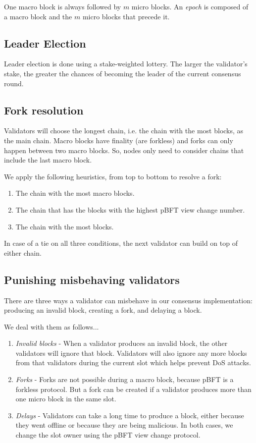 \documentclass[8pt,fleqn,openany]{book}
\begin{document}
One macro block is always followed by $m$ micro blocks. An \textit{epoch} is composed of a macro block and the $m$ micro blocks that precede it.

\subsection{Leader Election}
Leader election is done using a stake-weighted lottery. The larger the validator’s stake, the greater the chances of becoming the leader of the current consensus round.

\subsection{Fork resolution}
Validators will choose the longest chain, i.e. the chain with the most blocks, as the main chain. Macro blocks have finality (are forkless) and forks can only happen between two macro blocks. So, nodes only need to consider chains that include the last macro block.

We apply the following heuristics, from top to bottom to resolve a fork:

\begin{enumerate}
	\item The chain with the most macro blocks.
	\item The chain that has the blocks with the highest pBFT view change number.
	\item The chain with the most blocks.
\end{enumerate}

In case of a tie on all three conditions, the next validator can build on top of either chain.

\subsection{Punishing misbehaving validators}
There are three ways a validator can misbehave in our consensus implementation: producing an invalid block, creating a fork, and delaying a block.

We deal with them as follows...

\begin{enumerate}
	\item {\em Invalid blocks} - When a validator produces an invalid block, the other validators will ignore that block. Validators will also ignore any more blocks from that validators during the current slot which helps prevent DoS attacks.
	\item {\em Forks} - Forks are not possible during a macro block, because pBFT is a forkless protocol. But a fork can be created if a validator produces more than one micro block in the same slot. 
	\item {\em Delays} - Validators can take a long time to produce a block, either because they went offline or because they are being malicious. In both cases, we change the slot owner using the pBFT view change protocol. 
\end{enumerate}
\end{document}
